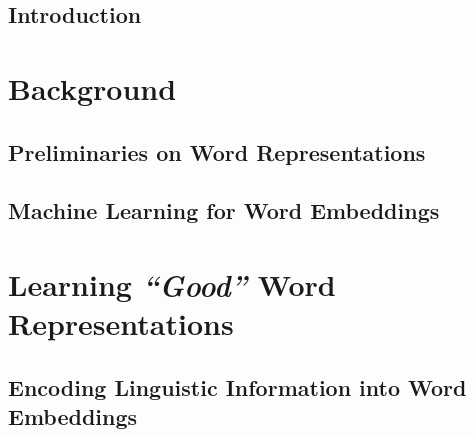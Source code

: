 \documentclass[11pt,twoside]{book}
\theoremstyle{definition}
\begin{document}
    
    \thispagestyle{empty} %
    \restoregeometry %

    \fancyhead[LE]{\textbf{\thepage}}
    \fancyhead[RO]{\textbf{\thepage}}
    \setcounter{tocdepth}{1} %
    \tableofcontents

    \chapter*{Introduction}
    

    \part{Background}
      \chapter{Preliminaries on Word Representations}
      \label{chap:preliminaries}
      
      \chapter{Machine Learning for Word Embeddings}
      \label{chap:ml-for-we}
      

    \part{Learning \textit{``Good''} Word Representations}
      \chapter{Encoding Linguistic Information into Word Embeddings}
      \label{chap:methods-we}
      
\end{document}
